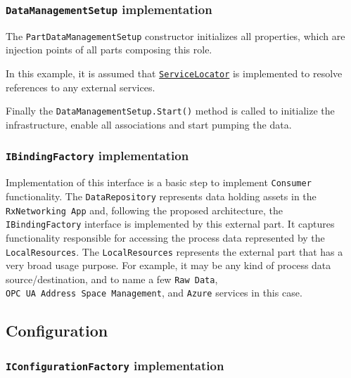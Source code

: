 \documentclass[
]{article}
\begin{document}
\hypertarget{datamanagementsetup-implementation}{%
\subsubsection{\texorpdfstring{\texttt{DataManagementSetup}
implementation}{DataManagementSetup implementation}}\label{datamanagementsetup-implementation}}

The \texttt{PartDataManagementSetup} constructor initializes all
properties, which are injection points of all parts composing this role.

In this example, it is assumed that
\href{https://www.nuget.org/packages/CommonServiceLocator}{\texttt{ServiceLocator}}
is implemented to resolve references to any external services.

Finally the \texttt{DataManagementSetup.Start()} method is called to
initialize the infrastructure, enable all associations and start pumping
the data.

\hypertarget{ibindingfactory-implementation}{%
\subsubsection{\texorpdfstring{\texttt{IBindingFactory}
implementation}{IBindingFactory implementation}}\label{ibindingfactory-implementation}}

Implementation of this interface is a basic step to implement
\texttt{Consumer} functionality. The \texttt{DataRepository} represents
data holding assets in the \texttt{RxNetworking\ App} and, following the
proposed architecture, the \texttt{IBindingFactory} interface is
implemented by this external part. It captures functionality responsible
for accessing the process data represented by the
\texttt{LocalResources}. The \texttt{LocalResources} represents the
external part that has a very broad usage purpose. For example, it may
be any kind of process data source/destination, and to name a few
\texttt{Raw\ Data}, \texttt{OPC\ UA\ Address\ Space\ Management}, and
\texttt{Azure} services in this case.

\hypertarget{configuration}{%
\subsection{Configuration}\label{configuration}}

\hypertarget{iconfigurationfactory-implementation}{%
\subsubsection{\texorpdfstring{\texttt{IConfigurationFactory}
implementation}{IConfigurationFactory implementation}}\label{iconfigurationfactory-implementation}}
\end{document}
